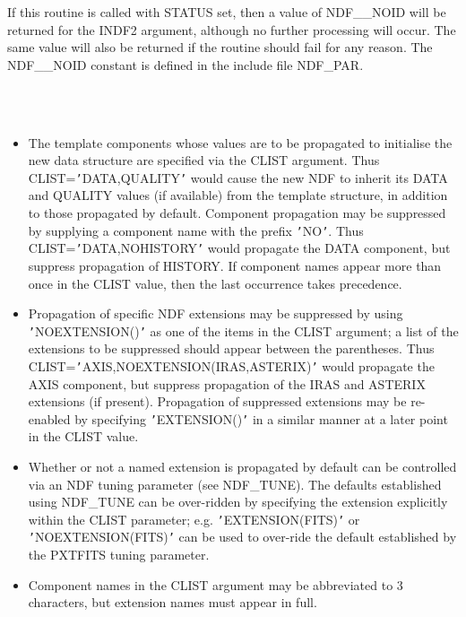 \documentclass[twoside,11pt]{article}
\newcommand{\sstdiytopic}[2]{\item[{\hspace{-0.35em}#1\hspace{-0.35em}:}]
\mbox{} \\[1.3ex] #2}
\newcommand{\sstitemlist}[1]{
  \mbox{} \\
  \vspace{-3.5ex}
  \begin{itemize}
     #1
  \end{itemize}
}
\newcommand{\sstitem}{\item}
\newcommand{\sstdiytopic}[2]{\item[{#1}] #2 }
\newcommand{\sstitemlist}[1]{
      \begin{itemize}
         #1
      \end{itemize}
      \\
   }
\newcommand{\sstitem}{\item}
\begin{document}
{{{         \sstitem
         If this routine is called with STATUS set, then a value of
         NDF\_\_NOID will be returned for the INDF2 argument, although no
         further processing will occur. The same value will also be
         returned if the routine should fail for any reason. The NDF\_\_NOID
         constant is defined in the include file NDF\_PAR.
      }
   }
   \sstdiytopic{
      Component Propagation
   }{
      \sstitemlist{

         \sstitem
         The template components whose values are to be propagated to
         initialise the new data structure are specified via the CLIST
         argument. Thus CLIST={\tt '}DATA,QUALITY{\tt '} would cause the new NDF to
         inherit its DATA and QUALITY values (if available) from the
         template structure, in addition to those propagated by default.
         Component propagation may be suppressed by supplying a component
         name with the prefix {\tt '}NO{\tt '}. Thus CLIST={\tt '}DATA,NOHISTORY{\tt '} would
         propagate the DATA component, but suppress propagation of
         HISTORY. If component names appear more than once in the CLIST
         value, then the last occurrence takes precedence.

         \sstitem
         Propagation of specific NDF extensions may be suppressed by
         using {\tt '}NOEXTENSION(){\tt '} as one of the items in the CLIST argument;
         a list of the extensions to be suppressed should appear between
         the parentheses. Thus CLIST={\tt '}AXIS,NOEXTENSION(IRAS,ASTERIX){\tt '}
         would propagate the AXIS component, but suppress propagation of
         the IRAS and ASTERIX extensions (if present). Propagation of
         suppressed extensions may be re-enabled by specifying
         {\tt '}EXTENSION(){\tt '} in a similar manner at a later point in the CLIST
         value.

         \sstitem
         Whether or not a named extension is propagated by default can be
         controlled via an NDF tuning parameter (see NDF\_TUNE). The defaults
         established using NDF\_TUNE can be over-ridden by specifying the
         extension explicitly within the CLIST parameter; e.g.
         {\tt '}EXTENSION(FITS){\tt '} or {\tt '}NOEXTENSION(FITS){\tt '} can be used to over-ride
         the default established by the PXTFITS tuning parameter.

         \sstitem
         Component names in the CLIST argument may be abbreviated to 3
         characters, but extension names must appear in full.
      }
   }
}
\end{document}
